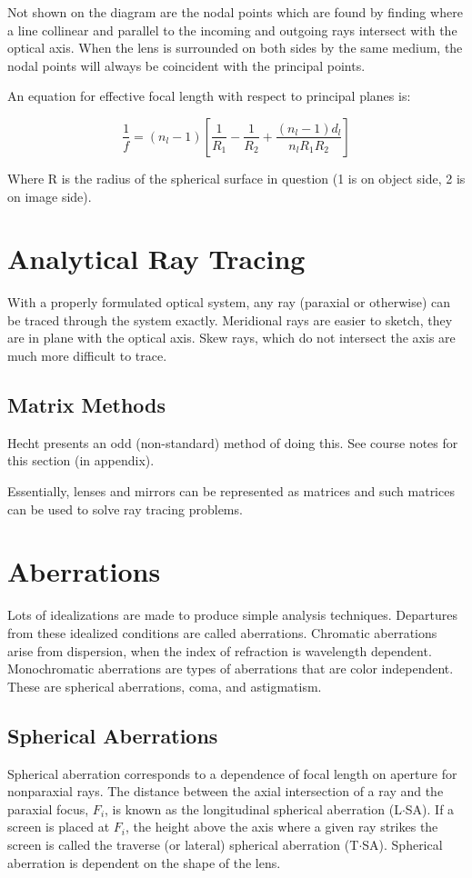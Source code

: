 \documentclass[12pt]{report}
\begin{document}
Not shown on the diagram are the nodal points which are found by finding where a line collinear and parallel to the incoming and outgoing rays intersect with the optical axis. When the lens is surrounded on both sides by the same medium, the nodal points will always be coincident with the principal points. 

An equation for effective focal length with respect to principal planes is:

\begin{equation}
\frac{1}{f} = (n_l - 1) \left[\frac{1}{R_1} - \frac{1}{R_2} + \frac{(n_l-1)d_l}{n_lR_1R_2}\right]
\end{equation}

Where R is the radius of the spherical surface in question (1 is on object side, 2 is on image side). 

\section{Analytical Ray Tracing}
With a properly formulated optical system, any ray (paraxial or otherwise) can be traced through the system exactly. Meridional rays are easier to sketch, they are in plane with the optical axis. Skew rays, which do not intersect the axis are much more difficult to trace. 
\subsection{Matrix Methods}
Hecht presents an odd (non-standard) method of doing this. See course notes for this section (in appendix).

Essentially, lenses and mirrors can be represented as matrices and such matrices can be used to solve ray tracing problems. 

\section{Aberrations} 

Lots of idealizations are made to produce simple analysis techniques. Departures from these idealized conditions are called aberrations. Chromatic aberrations arise from dispersion, when the index of refraction is wavelength dependent. Monochromatic aberrations are types of aberrations that are color independent. These are spherical aberrations, coma, and astigmatism. 

\subsection{Spherical Aberrations}
Spherical aberration corresponds to a dependence of focal length on aperture for nonparaxial rays. The distance between the axial intersection of a ray and the paraxial  focus, $F_i$, is known as the longitudinal spherical aberration (L$\cdot$SA). If a screen is placed at $F_i$, the height above the axis where a given ray strikes the screen is called the traverse (or lateral) spherical aberration (T$\cdot$SA). Spherical aberration is dependent on the shape of the lens. 
\end{document}
